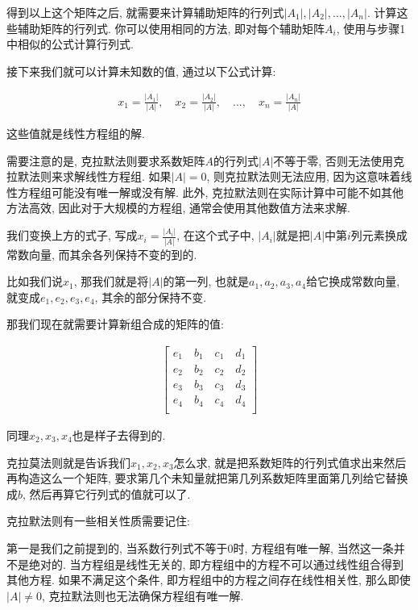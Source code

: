 得到以上这个矩阵之后, 就需要来计算辅助矩阵的行列式$|A_1|, |A_2|,..., |A_n|$. 计算这些辅助矩阵的行列式. 你可以使用相同的方法, 即对每个辅助矩阵$A_i$, 使用与步骤1中相似的公式计算行列式. 

接下来我们就可以计算未知数的值, 通过以下公式计算: 

\begin{align*}
  x_1 = \frac{|A_1|}{|A|}, \quad x_2 = \frac{|A_2|}{|A|}, \quad ..., \quad x_n = \frac{|A_n|}{|A|}
\end{align*}

这些值就是线性方程组的解. 

需要注意的是, 克拉默法则要求系数矩阵$A$的行列式$|A|$不等于零, 否则无法使用克拉默法则来求解线性方程组. 如果$|A| = 0$, 则克拉默法则无法应用, 因为这意味着线性方程组可能没有唯一解或没有解. 此外, 克拉默法则在实际计算中可能不如其他方法高效, 因此对于大规模的方程组, 通常会使用其他数值方法来求解. 

我们变换上方的式子, 写成$x_i = \frac{|A_i|}{|A|}$, 在这个式子中, $|A_i|$就是把$|A|$中第$i$列元素换成常数向量, 而其余各列保持不变的到的. 

比如我们说$x_1$, 那我们就是将$|A|$的第一列, 也就是${a_1, a_2, a_3, a_4}$给它换成常数向量, 就变成${e_1, e_2, e_3, e_4}$, 其余的部分保持不变. 

那我们现在就需要计算新组合成的矩阵的值: 

\begin{align*}
  \begin{bmatrix}
  e_1 \quad b_1 \quad c_1 \quad  d_1\\
  e_2 \quad b_2 \quad c_2 \quad  d_2\\ 
  e_3 \quad b_3 \quad c_3 \quad  d_3\\
  e_4 \quad b_4 \quad c_4 \quad  d_4\\
  \end{bmatrix}
\end{align*}


同理$x_2,x_3,x_4$也是样子去得到的. 

克拉莫法则就是告诉我们$x_1,x_2,x_3$怎么求, 就是把系数矩阵的行列式值求出来然后再构造这么一个矩阵, 要求第几个未知量就把第几列系数矩阵里面第几列给它替换成$b$, 然后再算它行列式的值就可以了. 

克拉默法则有一些相关性质需要记住:

第一是我们之前提到的, 当系数行列式不等于$0$时, 方程组有唯一解, 当然这一条并不是绝对的. 当方程组是线性无关的, 即方程组中的方程不可以通过线性组合得到其他方程. 如果不满足这个条件, 即方程组中的方程之间存在线性相关性, 那么即使$|A| \ne 0$, 克拉默法则也无法确保方程组有唯一解. 


